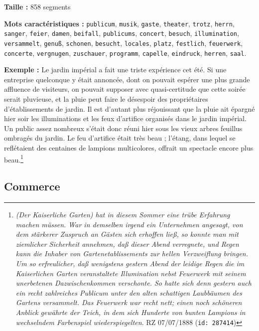 \documentclass[a4paper,twoside,12pt]{article}
\begin{document}
\begin{flushleft}
\textbf{Taille :} 858 segments

\textbf{Mots caractéristiques :} \texttt{publicum}, \texttt{musik}, \texttt{gaste}, \texttt{theater}, \texttt{trotz}, \texttt{herrn}, \texttt{sanger}, \texttt{feier}, \texttt{damen}, \texttt{beifall}, \texttt{publicums}, \texttt{concert}, \texttt{besuch}, \texttt{illumination}, \texttt{versammelt}, \texttt{genuß}, \texttt{schonen}, \texttt{besucht}, \texttt{locales}, \texttt{platz}, \texttt{festlich}, \texttt{feuerwerk}, \texttt{concerte}, \texttt{vergnugen}, \texttt{zuschauer}, \texttt{programm}, \texttt{capelle}, \texttt{eindruck}, \texttt{herren}, \texttt{saal}.
\end{flushleft}

\medskip

\noindent \textbf{Exemple :} \og Le jardin impérial a fait une triste expérience cet été. Si une entreprise quelconque y était annoncée, dont on pouvait espérer une plus grande affluence de visiteurs, on pouvait supposer avec quasi-certitude que cette soirée serait pluvieuse, et la pluie peut faire le désespoir des propriétaires d'établissements de jardin. Il est d'autant plus réjouissant que la pluie ait épargné hier soir les illuminations et les feux d'artifice organisés dans le jardin impérial. Un public assez nombreux s'était donc réuni hier sous les vieux arbres feuillus ombragés du jardin. Le feu d'artifice était très beau ; l'étang, dans lequel se reflétaient des centaines de lampions multicolores, offrait un spectacle encore plus beau.\fg{}\footnote{\textit{(Der Kaiserliche Garten) hat in diesem Sommer eine trübe Erfahrung machen müssen. War in demselben irgend ein Unternehmen angesagt, von dem stärkerer Zuspruch an Gästen sich erhoffen ließ, so konnte man mit ziemlicher Sicherheit annehmen, daß dieser Abend verregnete, und Regen kann die Inhaber von Gartenetablissements zur hellen Verzweiflung bringen. Um so erfreulicher, daß wenigstens gestern Abend der leidige Regen die im Kaiserlichen Garten veranstaltete Illumination nebst Feuerwerk mit seinem unerbetenen Dazwischenkommen verschonte. So hatte sich denn gestern auch ein recht zahlreiches Publicum unter den alten schattigen Laubbäumen des Gartens versammelt. Das Feuerwerk war recht nett; einen noch schöneren Anblick gewährte der Teich, in dem sich Hunderte von bunten Lampions in wechselndem Farbenspiel wiederspiegelten.} RZ 07/07/1888 (\texttt{id: 287414})}

\clearpage

\subsection*{Commerce} \label{topic4_commerce}
\end{document}
